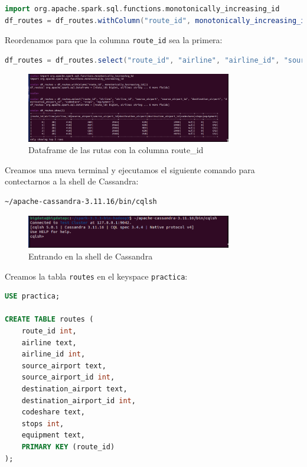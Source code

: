 \begin{lstlisting}[language=scala]
import org.apache.spark.sql.functions.monotonically_increasing_id
df_routes = df_routes.withColumn("route_id", monotonically_increasing_id())
\end{lstlisting}

Reordenamos para que la columna \texttt{route_id} sea la primera:

\begin{lstlisting}[language=scala]
df_routes = df_routes.select("route_id", "airline", "airline_id", "source_airport", "source_airport_id", "destination_airport", "destination_airport_id", "codeshare", "stops", "equipment")
\end{lstlisting}

\begin{figure}[H]
    \centering
    \includegraphics[width=0.8\textwidth]{figures/53.png}
    \caption{Dataframe de las rutas con la columna route\_id}
    \label{fig:routes_df_route_id}
\end{figure}

Creamos una nueva terminal y ejecutamos el siguiente comando para contectarnos a la shell de Cassandra:

\begin{lstlisting}[language=bash]
~/apache-cassandra-3.11.16/bin/cqlsh
\end{lstlisting}

\begin{figure}[H]
    \centering
    \includegraphics[width=0.8\textwidth]{figures/54.png}
    \caption{Entrando en la shell de Cassandra}
    \label{fig:enter_cassandra_shell}
\end{figure}

Creamos la tabla \texttt{routes} en el keyspace \texttt{practica}:

\begin{lstlisting}[language=sql]
USE practica;

CREATE TABLE routes (
    route_id int,
    airline text,
    airline_id int,
    source_airport text,
    source_airport_id int,
    destination_airport text,
    destination_airport_id int,
    codeshare text,
    stops int,
    equipment text,
    PRIMARY KEY (route_id)
);
\end{lstlisting}

